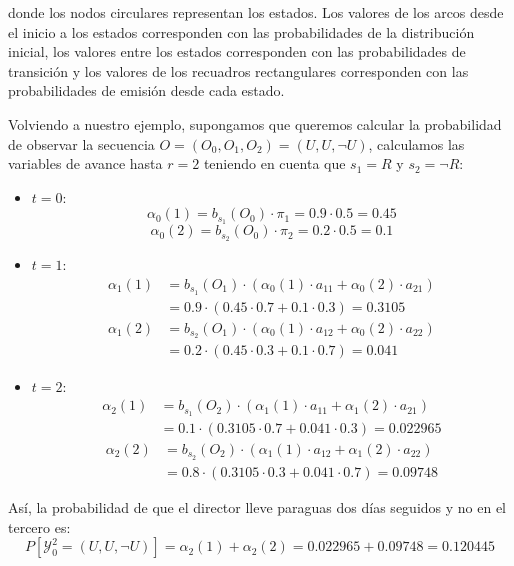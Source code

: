 \begin{exampleth}
donde los nodos circulares representan los estados. Los valores de los arcos desde el inicio a los estados corresponden con las probabilidades de la distribución inicial, los valores entre los estados corresponden con las probabilidades de transición y los valores de los recuadros rectangulares corresponden con las probabilidades de emisión desde cada estado.

Volviendo a nuestro ejemplo, supongamos que queremos calcular la probabilidad de observar la secuencia $O=(O_0,O_1,O_2)=(U,U,\neg U)$, calculamos las variables de avance hasta $r=2$ teniendo en cuenta que $s_1=R$ y $s_2=\neg R$:
\begin{itemize}
    \item $t=0$:
    \[\alpha_0(1)=b_{s_1}(O_0)\cdot\pi_1=0.9\cdot0.5=0.45\]
    \[\alpha_0(2)=b_{s_2}(O_0)\cdot\pi_2=0.2\cdot0.5=0.1\]
    \item $t=1$:
    \[
    \begin{aligned}
        \alpha_1(1)&=b_{s_1}(O_1)\cdot\left(\alpha_0(1)\cdot a_{11}+\alpha_0(2)\cdot a_{21} \right)\\
        &=0.9\cdot\left( 0.45\cdot0.7+0.1\cdot0.3 \right) = 0.3105
    \end{aligned}
    \]
    \[
    \begin{aligned}
        \alpha_1(2)&=b_{s_2}(O_1)\cdot\left(\alpha_0(1)\cdot a_{12}+\alpha_0(2)\cdot a_{22} \right)\\
        &=0.2\cdot\left(0.45\cdot0.3+0.1\cdot0.7\right)=0.041
    \end{aligned}
    \]
    \item $t=2$:
    \[
    \begin{aligned}
        \alpha_2(1)&=b_{s_1}(O_2)\cdot\left(\alpha_1(1)\cdot a_{11}+\alpha_1(2)\cdot a_{21} \right)\\
        &=0.1\cdot\left( 0.3105\cdot0.7+0.041\cdot0.3 \right) = 0.022965
    \end{aligned}
    \]
    \[
    \begin{aligned}
        \alpha_2(2)&=b_{s_2}(O_2)\cdot\left(\alpha_1(1)\cdot a_{12}+\alpha_1(2)\cdot a_{22} \right)\\
        &=0.8\cdot\left(0.3105\cdot0.3+0.041\cdot0.7\right)=0.09748
    \end{aligned}
    \]
\end{itemize}
Así, la probabilidad de que el director lleve paraguas dos días seguidos y no en el tercero es:
\[P[\mathcal{Y}_0^2=(U,U,\neg U)]=\alpha_2(1)+\alpha_2(2)=0.022965+0.09748=0.120445\]
\end{exampleth}

